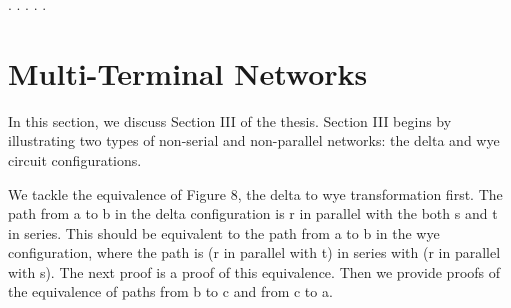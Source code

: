 \documentclass[11pt,twocolumn]{article}
\begin{document}
\begin{coqdoccode}
\coqdocindent{2.00em}
           .\coqdoceol
\coqdocnoindent
{}.\coqdoceol
\coqdocindent{1.00em}
      .\coqdoceol
\coqdocindent{1.00em}
      .\coqdoceol
\coqdocnoindent
{}.\coqdoceol
\coqdocemptyline
\end{coqdoccode}
\section{Multi-Terminal Networks}




In this section, we discuss Section III of the thesis.  Section III
begins by illustrating two types of non-serial and non-parallel
networks: the delta and wye circuit configurations.


We tackle the equivalence of Figure 8, the delta to wye transformation
first.  The path from a to b in the delta configuration is r in
parallel with the both s and t in series.  This should be equivalent
to the path from a to b in the wye configuration, where the path is (r
in parallel with t) in series with (r in parallel with s).  The next
proof is a proof of this equivalence.  Then we provide proofs of the
equivalence of paths from b to c and from c to a.
\end{document}
